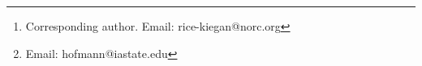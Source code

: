 \author[1]{Kiegan Rice\thanks{Corresponding author. Email: rice-kiegan@norc.org}}
\author[2]{Heike Hofmann\footnote{Email: hofmann@iastate.edu}}

